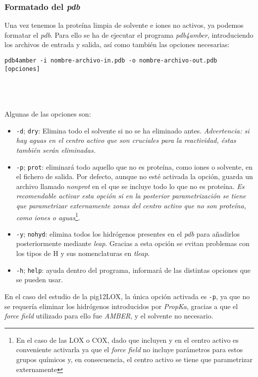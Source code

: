 			
		\subsubsection{Formatado del \textit{pdb}}
			Una vez tenemos la proteína limpia de solvente e iones no activos, ya podemos formatar el \textit{pdb}. Para ello se ha de ejecutar el programa \textit{pdb4amber}, introduciendo los archivos de entrada y salida, así como también las opciones necesarias:
			
			\begin{center}
			    \texttt{pdb4amber -i nombre-archivo-in.pdb -o nombre-archivo-out.pdb [opciones]}
			\end{center} 
			\ \\ 
			\ \\ 
			\ \\
			Algunas de las opciones son:
			\begin{itemize}
				\item \texttt{-d}; \texttt{\dg dry}: Elimina todo el solvente si no se ha eliminado antes. \emph{Advertencia: si hay aguas en el centro activo que son cruciales para la reactividad, éstas también serán eliminadas.}
				\item \texttt{-p}; \texttt{\dg prot}: eliminará todo aquello que no es proteína, como iones o solvente, en el fichero de salida. Por defecto, aunque no esté activada la opción, guarda un archivo llamado \textit{nonprot} en el que se incluye todo lo que no es proteína. \emph{Es recomendable activar esta opción si en la posterior parametrización se tiene que parametrizar externamente zonas del centro activo que no son proteína, como iones o aguas}\footnote{En el caso de las LOX o COX, dado que incluyen  y  en el centro activo es conveniente activarla ya que el \textit{force field} no incluye parámetros para estos grupos químicos y, en consecuencia, el centro activo se tiene que parametrizar externamente}.
				\item \texttt{-y}; \texttt{\dg nohyd}: elimina todos los hidrógenos presentes en el \textit{pdb} para añadirlos posteriormente mediante \textit{leap}. Gracias a esta opción se evitan problemas con los tipos de H y sus nomenclaturas en \textit{tleap}.
				\item \texttt{-h}; \texttt{\dg help}: ayuda dentro del programa, informará de las distintas opciones que se pueden usar.
			\end{itemize}
			
			\textsf{En el caso del estudio de la pig12LOX, la única opción activada es \texttt{-p}, ya que no se requería eliminar los hidrógenos introducidos por \textit{PropKa}, gracias a que el \textit{force field} utilizado para ello fue \textit{AMBER}, y el solvente no necesario.}


